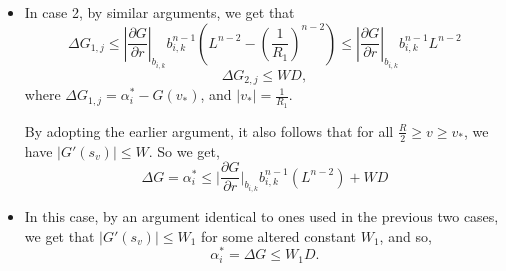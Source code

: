 \documentclass{article}
\theoremstyle{plain}
\theoremstyle{definition}
\theoremstyle{plain}
\begin{document}
\begin{itemize}
As $t_y \to 0$, the $o(t_y^2) M \approx o(t_y^2) \frac{D}{t_y} \approx o(t_y) \to 0$, and we have
$$\Delta G_{2,j} \le W \left( \frac{2}{R} \right)^{n-1} \left| \frac{\partial G}{\partial r} \right|_{b_{i,k}} b_{i,k}^{n-1} D$$


By a similar argument, for $\Delta G_{3,j}$, we see that the bound is given by $\Delta G_{3,j} \le WD$. \footnote{Note that this situation where $|G'(s_y)| \le W$ for $0 \le y \le y_*$, also takes care of the cases where the contribution due to the second derivative, at each infinitesimal step, to the change of the Green's function, is comparable to the contribution to the change of the Green's function due to the first order term. In particular, we may even have the situation where $|G'(s_y)| = 0$ in this regime.}. In this case, again, the total second order contribution is bounded crudely by $o(t_y^2) \frac{D}{t} = o(t_y)$ which goes to $0$ as $t_y \to 0$.

Thus the total change in the Green's function, $\Delta G_j$, is bounded from above by
\begin{equation*}
\Delta G_j \le \left| \frac{\partial G}{\partial r} \right|_{b_{i,k}} b_{i,k}^{n-1} L^{n-2} + W \left( \frac{2}{R} \right)^{n-1} \left| \frac{\partial G}{\partial r} \right|_{b_{i,k}} b_{i,k}^{n-1} D + WD.
\end{equation*}

As $j \to \infty$, we get, by the fact that $G_j \to 0$ continuously at the boundary, that
\begin{equation} \label{eq28}
\Delta G = \alpha_i^* \le \left| \frac{\partial G}{\partial r} \right|_{b_{i,k}} b_{i,k}^{n-1} \left( L^{n-2} + \left( \frac{2}{R} \right)^{n-1} WD \right) + WD
\end{equation}

\item In case 2, by similar arguments, we get that
\begin{equation*}
\Delta G_{1,j} \le \left| \frac{\partial G}{\partial r} \right|_{b_{i,k}} b_{i,k}^{n-1} \left( L^{n-2} - \left( \frac{1}{R_1} \right)^{n-2} \right) \le \left| \frac{\partial G}{\partial r} \right|_{b_{i,k}} b_{i,k}^{n-1} L^{n-2}
\end{equation*}
$$\Delta G_{2,j} \le WD,$$
where $\Delta G_{1,j} = \alpha_i^* - G(v_*)$, and $|v_*| = \frac{1}{R_1}$. 

By adopting the earlier argument, it also follows that for all $\frac{R}{2} \ge v \ge v_*$, we have $|G'(s_v)| \le W$. So we get, \begin{equation*}\Delta G = \alpha_i^* \le \Big|\frac{\partial G}{\partial r}\Big|_{b_{i,k}} b_{i,k}^{n-1} (L^{n-2}) + WD\end{equation*} 





\item In this case, by an argument identical to ones used in the previous two cases, we get that $|G'(s_v)| \le W_1$ for some altered constant $W_1$, and so,
$$\alpha_i^* = \Delta G \le W_1 D.$$

\end{itemize}
\end{document}
